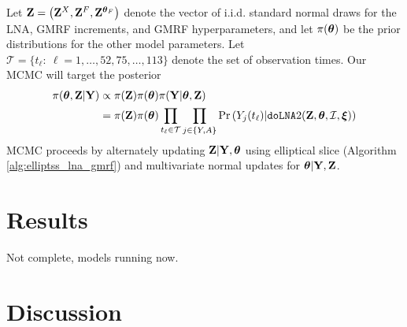 Let $ \mathbf{Z} = \left (\mathbf{Z}^X,\mathbf{Z}^F,\mathbf{Z}^{\boldsymbol{\theta}_F}\right ) $ denote the vector of i.i.d. standard normal draws for the LNA, GMRF increments, and GMRF hyperparameters, and let $ \pi(\boldsymbol{\theta}) $ be the prior distributions for the other model parameters. Let $ \mathcal{T} = \lbrace t_\ell:\ \ell = 1,\dots,52,75,\dots,113 \rbrace $ denote the set of observation times. Our MCMC will target the posterior
\begin{align}
\label{eqn:flu_posterior}
\pi(\boldsymbol{\theta},\mathbf{Z} | \mathbf{Y}) &\propto \pi(\mathbf{Z})\pi(\boldsymbol{\theta})\pi(\mathbf{Y}|\boldsymbol{\theta},\mathbf{Z}) \nonumber\\
&= \pi(\mathbf{Z})\pi(\boldsymbol{\theta}) \prod_{t_\ell\in\mathcal{T}}\prod_{j\in\lbrace Y,A\rbrace} \Pr\left (Y_{j}(t_\ell) | \texttt{doLNA}2(\mathbf{Z},\boldsymbol{\theta},\mathcal{I},\boldsymbol{\xi})\right )
\end{align}
MCMC proceeds by alternately updating $ \mathbf{Z}|\mathbf{Y},\boldsymbol{\theta} $ using elliptical slice (Algorithm \ref{alg:elliptss_lna_gmrf}) and multivariate normal updates for $ \boldsymbol{\theta}|\mathbf{Y},\mathbf{Z} $. 

\section{Results}
\label{sec:flu_results}

Not complete, models running now.

\section{Discussion}
\label{sec:flu_discussion}